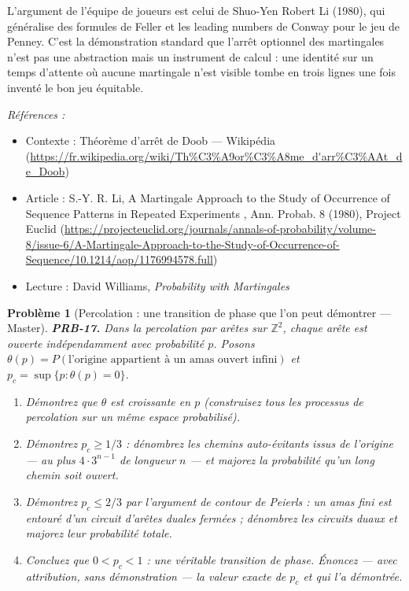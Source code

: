 \documentclass[11pt]{article}
\newtheorem{problem}{Problème}
\newenvironment{refs}{\par\small\noindent\emph{Références :}\begin{itemize}\setlength\itemsep{0pt}}{\end{itemize}\normalsize}
\begin{document}
\noindent L'argument de l'équipe de joueurs est celui de Shuo-Yen Robert Li (1980), qui
généralise des formules de Feller et les \og{} leading numbers \fg{} de Conway pour le jeu de Penney. C'est
la démonstration standard que l'arrêt optionnel des martingales n'est pas une abstraction mais un
instrument de calcul : une identité sur un temps d'attente où aucune martingale n'est visible tombe
en trois lignes une fois inventé le bon jeu équitable.

\begin{refs}
\item Contexte : Théorème d'arrêt de Doob --- Wikipédia (\url{https://fr.wikipedia.org/wiki/Th%C3%A9or%C3%A8me_d'arr%C3%AAt_de_Doob})
\item Article : S.-Y. R. Li, \og{} A Martingale Approach to the Study of Occurrence of Sequence Patterns in Repeated Experiments \fg{}, Ann. Probab. 8 (1980), Project Euclid (\url{https://projecteuclid.org/journals/annals-of-probability/volume-8/issue-6/A-Martingale-Approach-to-the-Study-of-Occurrence-of-Sequence/10.1214/aop/1176994578.full})
\item Lecture : David Williams, \textit{Probability with Martingales}
\end{refs}

\bigskip

\begin{problem}[{Percolation : une transition de phase que l'on peut démontrer --- Master}]
\textbf{PRB-17.} Dans la percolation par arêtes sur $ \mathbb{Z}^2 $,
chaque arête est \textit{ouverte} indépendamment avec probabilité $ p $. Posons
$ \theta(p) = P(\text{l'origine appartient à un amas ouvert infini}) $ et
$ p_c = \sup\{p : \theta(p) = 0\} $.
\begin{enumerate}
\item[(i)] Démontrez que $ \theta $ est croissante en $ p $ (construisez tous les processus de
percolation sur un même espace probabilisé).
\item[(ii)] Démontrez $ p_c \ge 1/3 $ : dénombrez les chemins auto-évitants issus de l'origine --- au plus
$ 4\cdot 3^{n-1} $ de longueur $ n $ --- et majorez la probabilité qu'un long chemin soit
ouvert.
\item[(iii)] Démontrez $ p_c \le 2/3 $ par l'argument de contour de Peierls : un amas fini est entouré
d'un circuit d'arêtes duales fermées ; dénombrez les circuits duaux et majorez leur probabilité
totale.
\item[(iv)] Concluez que $ 0 < p_c < 1 $ : une véritable transition de phase. Énoncez --- avec
attribution, sans démonstration --- la valeur exacte de $ p_c $ et qui l'a démontrée.
\end{enumerate}

\end{problem}
\end{document}
